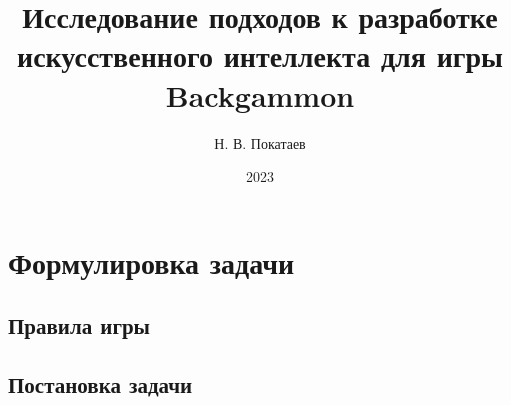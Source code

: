 \documentclass[14pt, a4paper]{extarticle}
\title{Исследование подходов к разработке искусственного интеллекта для игры Backgammon}
\author{Н. В. Покатаев}
\date{2023}
\begin{document}
\maketitle

\tableofcontents



\section{Формулировка задачи}

\subsection{Правила игры}


\subsection{Постановка задачи}





\end{document}
